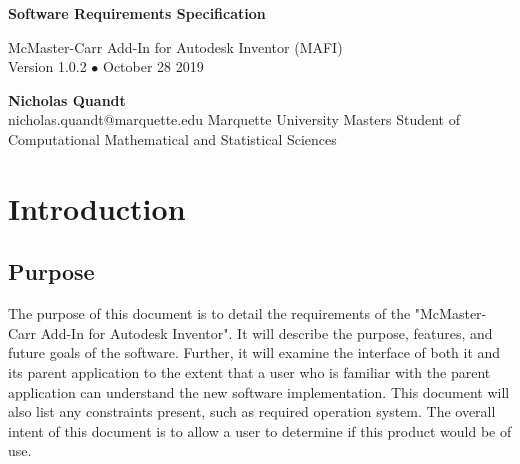 \documentclass[12pt, letterpaper]{article}
\begin{document}
\begin{titlepage}
   \begin{flushright}
       \vspace*{5cm}
 
       {\Huge \textbf{Software Requirements Specification}}
 
       \vspace{0.5cm}
        McMaster-Carr Add-In for Autodesk Inventor (MAFI)\\
        Version 1.0.2 $\bullet$ October 28 2019
 
       \vspace{1.5cm}
 
       \textbf{Nicholas Quandt}
       \\
       nicholas.quandt@marquette.edu
       \vfill
       Marquette University Masters Student of\\
       Computational Mathematical and Statistical Sciences\\
       \vspace{1cm}
 
   \end{flushright}
\end{titlepage}


\tableofcontents
\newpage

\section{Introduction}
\subsection{Purpose}
The purpose of this document is to detail the requirements of the "McMaster-Carr Add-In for Autodesk Inventor". It will describe the purpose, features, and future goals of the software. Further, it will examine the interface of both it and its parent application to the extent that a user who is familiar with the parent application can understand the new software implementation. This document will also list any constraints present, such as required operation system. The overall intent of this document is to allow a user to determine if this product would be of use.
\end{document}
